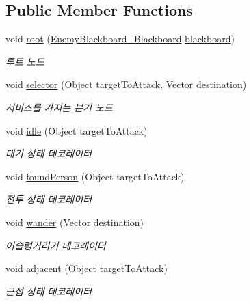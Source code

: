 \subsection*{Public Member Functions}
\begin{DoxyCompactItemize}
\item 
void \hyperlink{class_giant_behavior_tree___behavior_tree_a114fdcc0b7b18a7541994c0561d9102d}{root} (\hyperlink{class_enemy_blackboard___blackboard}{Enemy\+Blackboard\+\_\+\+Blackboard} \hyperlink{class_giant_behavior_tree___behavior_tree_a2e26ad9e0c272be24d87a8c1a283895a}{blackboard})
\begin{DoxyCompactList}\small\item\em 루트 노드 \end{DoxyCompactList}\item 
void \hyperlink{class_giant_behavior_tree___behavior_tree_a3eba6d53ad774ed86427759a7437ae2c}{selector} (Object target\+To\+Attack, Vector destination)
\begin{DoxyCompactList}\small\item\em 서비스를 가지는 분기 노드 \end{DoxyCompactList}\item 
void \hyperlink{class_giant_behavior_tree___behavior_tree_ad75d5834908366c41eeb6bab6b409a6b}{idle} (Object target\+To\+Attack)
\begin{DoxyCompactList}\small\item\em 대기 상태 데코레이터 \end{DoxyCompactList}\item 
void \hyperlink{class_giant_behavior_tree___behavior_tree_a07dfd4e1bc0e99b7dabed86be3f19257}{found\+Person} (Object target\+To\+Attack)
\begin{DoxyCompactList}\small\item\em 전투 상태 데코레이터 \end{DoxyCompactList}\item 
void \hyperlink{class_giant_behavior_tree___behavior_tree_ab0fdd6e302f64b84b216cdec31baeb76}{wander} (Vector destination)
\begin{DoxyCompactList}\small\item\em 어슬렁거리기 데코레이터 \end{DoxyCompactList}\item 
void \hyperlink{class_giant_behavior_tree___behavior_tree_af346a6b3b986b6f9092255672e3ce833}{adjacent} (Object target\+To\+Attack)
\begin{DoxyCompactList}\small\item\em 근접 상태 데코레이터 \end{DoxyCompactList}\item 

\end{DoxyCompactItemize}
